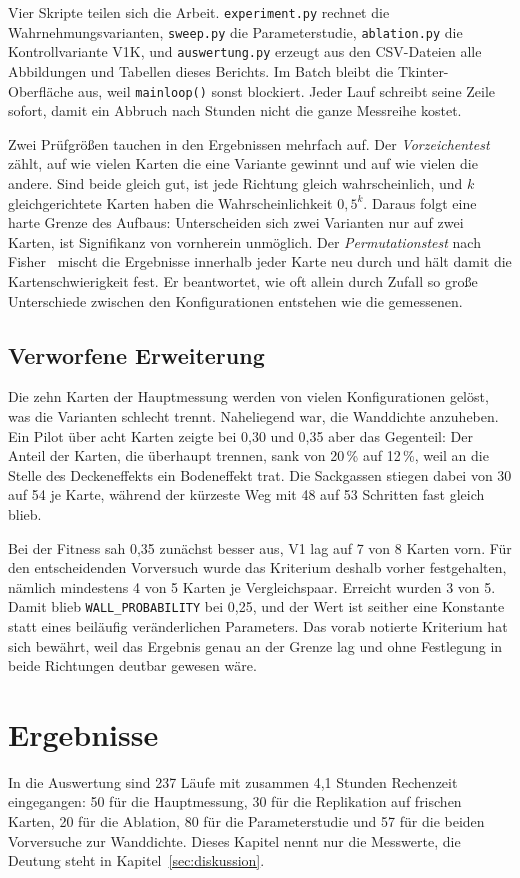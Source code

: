 \documentclass[sigconf]{acmart}
\begin{document}
Vier Skripte teilen sich die Arbeit. \texttt{experiment.py} rechnet die Wahrnehmungsvarianten, \texttt{sweep.py} die Parameterstudie, \texttt{ablation.py} die Kontrollvariante V1K, und \texttt{auswertung.py} erzeugt aus den CSV-Dateien alle Abbildungen und Tabellen dieses Berichts. Im Batch bleibt die Tkinter-Oberfläche aus, weil \texttt{mainloop()} sonst blockiert. Jeder Lauf schreibt seine Zeile sofort, damit ein Abbruch nach Stunden nicht die ganze Messreihe kostet.

Zwei Prüfgrößen tauchen in den Ergebnissen mehrfach auf. Der \emph{Vorzeichentest} zählt, auf wie vielen Karten die eine Variante gewinnt und auf wie vielen die andere. Sind beide gleich gut, ist jede Richtung gleich wahrscheinlich, und $k$ gleichgerichtete Karten haben die Wahrscheinlichkeit $0{,}5^k$. Daraus folgt eine harte Grenze des Aufbaus: Unterscheiden sich zwei Varianten nur auf zwei Karten, ist Signifikanz von vornherein unmöglich. Der \emph{Permutationstest} nach Fisher~\cite[Kap.~III, \S21, S.~50--54]{fisher1935} mischt die Ergebnisse innerhalb jeder Karte neu durch und hält damit die Kartenschwierigkeit fest. Er beantwortet, wie oft allein durch Zufall so große Unterschiede zwischen den Konfigurationen entstehen wie die gemessenen.

\subsection{Verworfene Erweiterung}
Die zehn Karten der Hauptmessung werden von vielen Konfigurationen gelöst, was die Varianten schlecht trennt. Naheliegend war, die Wanddichte anzuheben. Ein Pilot über acht Karten zeigte bei 0,30 und 0,35 aber das Gegenteil: Der Anteil der Karten, die überhaupt trennen, sank von 20\,\% auf 12\,\%, weil an die Stelle des Deckeneffekts ein Bodeneffekt trat. Die Sackgassen stiegen dabei von 30 auf 54 je Karte, während der kürzeste Weg mit 48 auf 53 Schritten fast gleich blieb.

Bei der Fitness sah 0,35 zunächst besser aus, V1 lag auf 7 von 8 Karten vorn. Für den entscheidenden Vorversuch wurde das Kriterium deshalb vorher festgehalten, nämlich mindestens 4 von 5 Karten je Vergleichspaar. Erreicht wurden 3 von 5. Damit blieb \texttt{WALL\_PROBABILITY} bei 0,25, und der Wert ist seither eine Konstante statt eines beiläufig veränderlichen Parameters. Das vorab notierte Kriterium hat sich bewährt, weil das Ergebnis genau an der Grenze lag und ohne Festlegung in beide Richtungen deutbar gewesen wäre.

\section{Ergebnisse}
\label{sec:ergebnisse}
In die Auswertung sind 237 Läufe mit zusammen 4,1 Stunden Rechenzeit eingegangen: 50 für die Hauptmessung, 30 für die Replikation auf frischen Karten, 20 für die Ablation, 80 für die Parameterstudie und 57 für die beiden Vorversuche zur Wanddichte. Dieses Kapitel nennt nur die Messwerte, die Deutung steht in Kapitel~\ref{sec:diskussion}.
\end{document}
